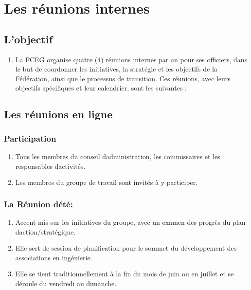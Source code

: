 \section{Les réunions internes}
\label{les-reunions-internes}

\subsection{L'objectif}
\label{lobjectif}

\begin{enumerate}
 \item
  La FCEG organise quatre (4) réunions internes par an pour ses officiers, dans le but de coordonner les initiatives, la stratégie et les objectifs de la Fédération, ainsi que le processus de transition. Ces réunions, avec leurs objectifs spécifiques et leur calendrier, sont les suivantes :
\end{enumerate}

\subsection{Les réunions en ligne}
\label{les-reunions-en-ligne}

\subsubsection{Participation}
\label{participation}

\begin{enumerate}
 \item
  Tous les membres du conseil d\textquotesingle administration, les commissaires et les responsables d\textquotesingle activités.
 \item
  Les membres du groupe de travail sont invités à y participer.
\end{enumerate}

\subsubsection{La Réunion d\textquotesingle été:}
\label{la-reunion-d-ete}

\begin{enumerate}
 \item
  Accent mis sur les initiatives du groupe, avec un examen des progrès du plan d\textquotesingle action/stratégique.
 \item
  Elle sert de session de planification pour le sommet du développement des associations en ingénierie.
 \item
  Elle se tient traditionnellement à la fin du mois de juin ou en juillet et se déroule du vendredi au dimanche.
\end{enumerate}

